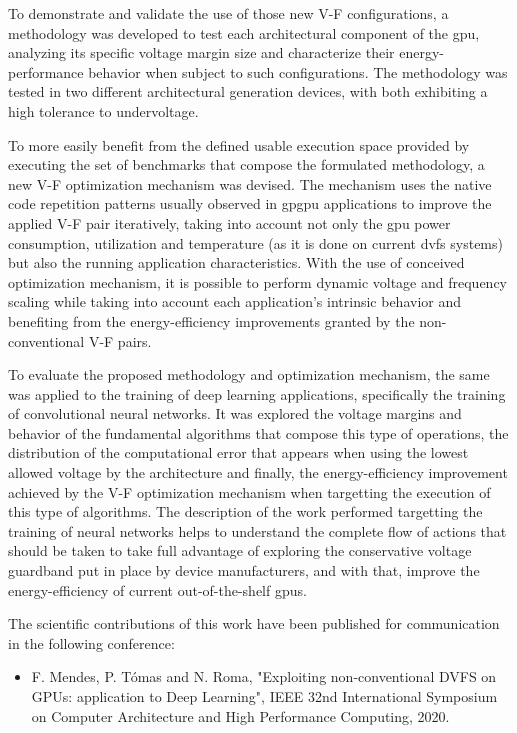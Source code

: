 To demonstrate and validate the use of those new V-F configurations, a methodology was developed to test each architectural component of the \acrshort{gpu}, analyzing its specific voltage margin size and characterize their energy-performance behavior when subject to such configurations. The methodology was tested in two different architectural generation devices, with both exhibiting a high tolerance to undervoltage.

To more easily benefit from the defined usable execution space provided by executing the set of benchmarks that compose the formulated methodology, a new V-F optimization mechanism was devised. The mechanism uses the native code repetition patterns usually observed in \acrshort{gpgpu} applications to improve the applied V-F pair iteratively, taking into account not only the \acrshort{gpu} power consumption, utilization and temperature (as it is done on current \acrshort{dvfs} systems) but also the running application characteristics. With the use of conceived optimization mechanism, it is possible to perform dynamic voltage and frequency scaling while taking into account each application's intrinsic behavior and benefiting from the energy-efficiency improvements granted by the non-conventional V-F pairs.

To evaluate the proposed methodology and optimization mechanism, the same was applied to the training of deep learning applications, specifically the training of convolutional neural networks. It was explored the voltage margins and behavior of the fundamental algorithms that compose this type of operations, the distribution of the computational error that appears when using the lowest allowed voltage by the architecture and finally, the energy-efficiency improvement achieved by the V-F optimization mechanism when targetting the execution of this type of algorithms. The description of the work performed targetting the training of neural networks helps to understand the complete flow of actions that should be taken to take full advantage of exploring the conservative voltage guardband put in place by device manufacturers, and with that, improve the energy-efficiency of current out-of-the-shelf \acrshort{gpu}s.

The scientiﬁc contributions of this work have been published for communication in the following conference:

\begin{itemize}
    \item F. Mendes, P. Tómas and N. Roma, "Exploiting non-conventional DVFS on GPUs: application to Deep Learning", IEEE 32nd International Symposium on Computer Architecture and High Performance Computing, 2020.
\end{itemize}


